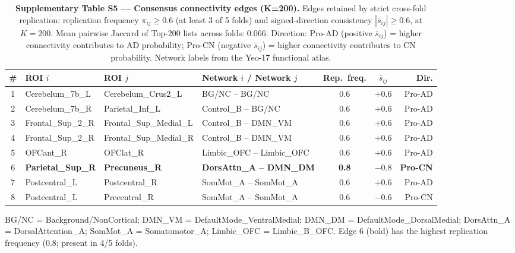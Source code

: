\begin{table}[H]
\centering
\caption{\textbf{Supplementary Table S5 — Consensus connectivity edges (K=200).}
Edges retained by strict cross-fold replication: replication frequency $\pi_{ij}\!\ge\!0.6$
(at least 3 of 5 folds) and signed-direction consistency $|\bar{s}_{ij}|\!\ge\!0.6$, at $K\!=\!200$.
Mean pairwise Jaccard of Top-200 lists across folds: 0.066.
Direction: Pro-AD (positive $\bar{s}_{ij}$) = higher connectivity contributes to AD probability;
Pro-CN (negative $\bar{s}_{ij}$) = higher connectivity contributes to CN probability.
Network labels from the Yeo-17 functional atlas.}
\label{tab:consensus_edges_s5}
\small
\begin{tabular}{@{}clllccr@{}}
\toprule
\textbf{\#} & \textbf{ROI $i$} & \textbf{ROI $j$} & \textbf{Network $i$ / Network $j$} & \textbf{Rep.\ freq.} & $\bar{s}_{ij}$ & \textbf{Dir.} \\
\midrule
1 & Cerebelum\_7b\_L & Cerebelum\_Crus2\_L & BG/NC -- BG/NC & 0.6 & $+0.6$ & Pro-AD \\
2 & Cerebelum\_7b\_R & Parietal\_Inf\_L   & Control\_B -- BG/NC & 0.6 & $+0.6$ & Pro-AD \\
3 & Frontal\_Sup\_2\_R & Frontal\_Sup\_Medial\_L & Control\_B -- DMN\_VM & 0.6 & $+0.6$ & Pro-AD \\
4 & Frontal\_Sup\_2\_R & Frontal\_Sup\_Medial\_R & Control\_B -- DMN\_VM & 0.6 & $+0.6$ & Pro-AD \\
5 & OFCant\_R & OFClat\_R & Limbic\_OFC -- Limbic\_OFC & 0.6 & $+0.6$ & Pro-AD \\
6 & \textbf{Parietal\_Sup\_R} & \textbf{Precuneus\_R} & \textbf{DorsAttn\_A -- DMN\_DM} & \textbf{0.8} & $\mathbf{-0.8}$ & \textbf{Pro-CN} \\
7 & Postcentral\_L & Postcentral\_R & SomMot\_A -- SomMot\_A & 0.6 & $+0.6$ & Pro-AD \\
8 & Postcentral\_L & Precentral\_R  & SomMot\_A -- SomMot\_A & 0.6 & $-0.6$ & Pro-CN \\
\bottomrule
\end{tabular}
\vspace{0.4em}

\noindent\footnotesize
BG/NC = Background/NonCortical; DMN\_VM = DefaultMode\_VentralMedial;
DMN\_DM = DefaultMode\_DorsalMedial; DorsAttn\_A = DorsalAttention\_A;
SomMot\_A = Somatomotor\_A; Limbic\_OFC = Limbic\_B\_OFC.
Edge 6 (bold) has the highest replication frequency (0.8; present in 4/5 folds).
\end{table}
